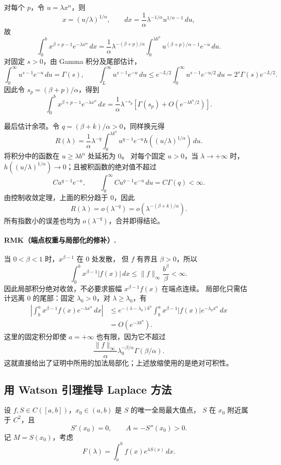 \documentclass[11pt,a4paper]{ctexart}
\begin{document}
对每个 $p$，令 $u=\lambda x^\alpha$，则
\[
 x=(u/\lambda)^{1/\alpha},\qquad
 dx=\frac1\alpha\lambda^{-1/\alpha}u^{1/\alpha-1}\,du,
\]
故
\[
 \int_0^b x^{\beta+p-1}e^{-\lambda x^\alpha}\,dx
 =\frac1\alpha\lambda^{-(\beta+p)/\alpha}
 \int_0^{\lambda b^\alpha}u^{(\beta+p)/\alpha-1}e^{-u}\,du.
\]
对固定 $s>0$，由 Gamma 积分及尾部估计，
\[
 \int_0^\infty u^{s-1}e^{-u}\,du=\Gamma(s),\qquad
 \int_L^\infty u^{s-1}e^{-u}\,du
 \le e^{-L/2}\int_0^\infty u^{s-1}e^{-u/2}\,du
 =2^s\Gamma(s)e^{-L/2}.
\]
因此令 $s_p=(\beta+p)/\alpha$，得到
\[
 \int_0^b x^{\beta+p-1}e^{-\lambda x^\alpha}\,dx
 =\frac1\alpha\lambda^{-s_p}
 \left[\Gamma(s_p)+O(e^{-\lambda b^\alpha/2})\right].
\]

最后估计余项。令 $q=(\beta+k)/\alpha>0$，同样换元得
\[
 R(\lambda)=\frac1\alpha\lambda^{-q}
 \int_0^{\lambda b^\alpha}u^{q-1}e^{-u}
 h\!\left((u/\lambda)^{1/\alpha}\right)\,du.
\]
将积分中的函数在 $u\ge\lambda b^\alpha$ 处延拓为 $0$。
对每个固定 $u>0$，当 $\lambda\to+\infty$ 时，
$h((u/\lambda)^{1/\alpha})\to0$；且被积函数的绝对值不超过
\[
 C u^{q-1}e^{-u},\qquad
 \int_0^\infty C u^{q-1}e^{-u}\,du=C\Gamma(q)<\infty.
\]
由控制收敛定理，上面的积分趋于 $0$，因此
\[
 R(\lambda)=o(\lambda^{-q})
 =o\!\left(\lambda^{-(\beta+k)/\alpha}\right).
\]
所有指数小的误差也均为 $o(\lambda^{-q})$，合并即得结论。

\paragraph{RMK（端点权重与局部化的修补）.}
当 $0<\beta<1$ 时，$x^{\beta-1}$ 在 $0$ 处发散，
但 $f$ 有界且 $\beta>0$，所以
\[
 \int_0^b x^{\beta-1}|f(x)|\,dx
 \le\|f\|_\infty\frac{b^\beta}{\beta}<\infty.
\]
因此局部积分绝对收敛，不必要求振幅 $x^{\beta-1}f(x)$ 在端点连续。
局部化只需估计远离 $0$ 的尾部：固定 $\lambda_0>0$，对
$\lambda\ge\lambda_0$，有
\begin{align*}
 \left|\int_b^a x^{\beta-1}f(x)e^{-\lambda x^\alpha}\,dx\right|
 &\le e^{-(\lambda-\lambda_0)b^\alpha}
 \int_b^a x^{\beta-1}|f(x)|e^{-\lambda_0x^\alpha}\,dx\\
 &=O(e^{-\lambda b^\alpha}).
\end{align*}
这里的固定积分即使 $a=+\infty$ 也有限，因为它不超过
\[
 \frac{\|f\|_\infty}{\alpha}
 \lambda_0^{-\beta/\alpha}\Gamma(\beta/\alpha).
\]
这就直接给出了证明中所用的加法局部化；上述放缩使用的是绝对可积性。

\subsection*{用 Watson 引理推导 Laplace 方法}
设 $f,S\in C([a,b])$，$x_0\in(a,b)$ 是 $S$ 的唯一全局最大值点，
$S$ 在 $x_0$ 附近属于 $C^2$，且
\[
 S'(x_0)=0,\qquad A=-S''(x_0)>0.
\]
记 $M=S(x_0)$，考虑
\[
 F(\lambda)=\int_a^b f(x)e^{\lambda S(x)}\,dx.
\]
\end{document}
